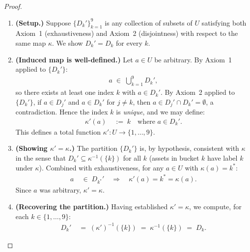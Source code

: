 \documentclass[12pt,openany]{book}
\newcommand{\calU}{\mathcal{U}}
\newcommand{\calD}{\mathcal{D}}
\numberwithin{equation}{chapter}
\theoremstyle{plain}
\theoremstyle{definition}
\theoremstyle{remark}
\def\calU{U}%
\def\calD{D}%
\def\mathcal#1{#1}%
\begin{document}
\begin{proof}
\begin{enumerate}
\begin{enumerate}
    \item \textbf{(Setup.)}
          Suppose $\{\calD_k'\}_{k=1}^{9}$ is any collection of
          subsets of $\calU$ satisfying both
          Axiom~1 (exhaustiveness) and Axiom~2 (disjointness)
          with respect to the same map $\kappa$.
          We show $\calD_k' = \calD_k$ for every $k$.

    \item \textbf{(Induced map is well-defined.)}
          Let $a \in \calU$ be arbitrary.
          By Axiom~1 applied to $\{\calD_k'\}$:
          \begin{align}
            a \;\in\; \bigcup_{k=1}^{9} \calD_k',
          \end{align}
          so there exists at least one index $k$ with
          $a \in \calD_k'$.
          By Axiom~2 applied to $\{\calD_k'\}$, if
          $a \in \calD_j'$ and $a \in \calD_k'$ for $j \neq k$,
          then $a \in \calD_j' \cap \calD_k' = \emptyset$,
          a contradiction.
          Hence the index $k$ is \emph{unique}, and we may define:
          \begin{align}
            \kappa'(a) &\;:=\; k
            \quad \text{where } a \in \calD_k'.
            \label{eq:kappa-prime}
          \end{align}
          This defines a total function
          $\kappa' : \calU \to \{1,\ldots,9\}$.

    \item \textbf{(Showing $\kappa' = \kappa$.)}
          The partition $\{\calD_k'\}$ is, by hypothesis,
          consistent with $\kappa$ in the sense that
          $\calD_k' \subseteq \kappa^{-1}(\{k\})$ for all $k$
          (assets in bucket $k$ have label $k$ under $\kappa$).
          Combined with exhaustiveness, for any $a \in \calU$
          with $\kappa(a) = k^*$:
          \begin{align}
            a &\;\in\; \calD_{k^*}' \quad
            \Longrightarrow \quad
            \kappa'(a) = k^* = \kappa(a).
          \end{align}
          Since $a$ was arbitrary, $\kappa' = \kappa$.

    \item \textbf{(Recovering the partition.)}
          Having established $\kappa' = \kappa$, we compute,
          for each $k \in \{1,\ldots,9\}$:
          \begin{align}
            \calD_k'
            &\;=\; (\kappa')^{-1}(\{k\})
             \;=\; \kappa^{-1}(\{k\})
             \;=\; \calD_k.
            \label{eq:unique-final}
          \end{align}


\end{enumerate}
\end{enumerate}
\end{proof}
\end{document}
